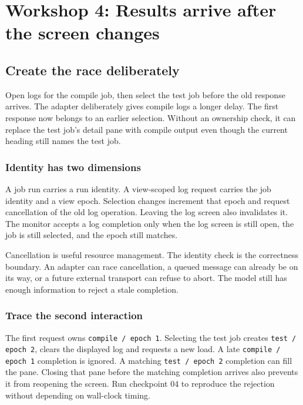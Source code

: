 \chapter{Workshop 4: Results arrive after the screen changes}\label{workshop-04}

\section{Create the race deliberately}

Open logs for the compile job, then select the test job before the old response arrives. The adapter deliberately gives compile logs a longer delay. The first response now belongs to an earlier selection. Without an ownership check, it can replace the test job's detail pane with compile output even though the current heading still names the test job.

\subsection{Identity has two dimensions}

A job run carries a run identity. A view-scoped log request carries the job identity and a view epoch. Selection changes increment that epoch and request cancellation of the old log operation. Leaving the log screen also invalidates it. The monitor accepts a log completion only when the log screen is still open, the job is still selected, and the epoch still matches.

Cancellation is useful resource management. The identity check is the correctness boundary. An adapter can race cancellation, a queued message can already be on its way, or a future external transport can refuse to abort. The model still has enough information to reject a stale completion.



\subsection{Trace the second interaction}

The first request owns \texttt{compile / epoch 1}. Selecting the test job creates \texttt{test / epoch 2}, clears the displayed log and requests a new load. A late \texttt{compile / epoch 1} completion is ignored. A matching \texttt{test / epoch 2} completion can fill the pane. Closing that pane before the matching completion arrives also prevents it from reopening the screen. Run checkpoint 04 to reproduce the rejection without depending on wall-clock timing.

